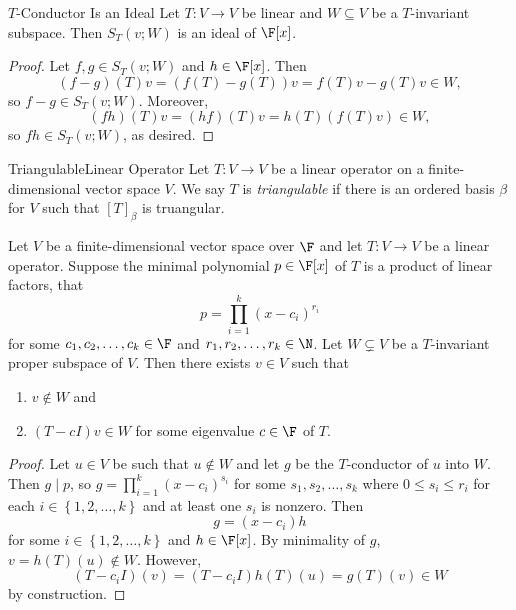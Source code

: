 \documentclass[linearalgebraII]{subfiles}
\begin{document}
    \begin{prop}{$T$-Conductor Is an Ideal}
        Let $T:V\to V$ be linear and $W\subseteq V$ be a $T$-invariant subspace. Then $S_T(v; W)$ is an ideal of $\F[x]$.
    \end{prop}

    \begin{proof}
        Let $f,g\in S_T(v; W)$ and $h\in \F[x]$. Then
        \begin{equation*}
            (f-g)(T)v = \left( f(T)-g(T) \right) v = f(T)v - g(T)v\in W,
        \end{equation*}
        so $f-g\in S_T(v; W)$. Moreover,
        \begin{equation*}
            (fh)(T)v = (hf)(T)v = h(T)\left( f(T)v \right) \in W,
        \end{equation*}
        so $fh\in S_T(v; W)$, as desired.
    \end{proof}

    \begin{definition}{Triangulable}{Linear Operator}
        Let $T:V\to V$ be a linear operator on a finite-dimensional vector space $V$. We say $T$ is \emph{triangulable} if there is an ordered basis $\beta$ for $V$ such that $[T]_\beta$ is truangular.
    \end{definition}
    
    \begin{prop}{}
        Let $V$ be a finite-dimensional vector space over $\F$ and let $T:V\to V$ be a linear operator. Suppose the minimal polynomial $p\in\F[x]$ of $T$ is a product of linear factors, that
        \begin{equation*}
            p = \prod^{k}_{i=1} (x-c_i)^{r_i}
        \end{equation*}
        for some $c_1, c_2, \ldots, c_k\in \F$ and $r_1, r_2, \ldots, r_k\in \N$. Let $W\subsetneq V$ be a $T$-invariant proper subspace of $V$. Then there exists $v\in V$ such that
        \begin{enumerate}
            \item $v\notin W$ and
            \item $(T-cI)v\in W$ for some eigenvalue $c\in\F$ of $T$.
        \end{enumerate}
    \end{prop}

    \begin{proof}
        Let $u\in V$ be such that $u\notin W$ and let $g$ be the $T$-conductor of $u$ into $W$. Then $g\mid p$, so $g = \prod^{k}_{i=1} (x-c_i)^{s_i}$ for some $s_1, s_2, \ldots, s_k$ where $0\leq s_i\leq r_i$ for each $i\in \left\lbrace 1, 2, \ldots, k \right\rbrace$ and at least one $s_i$ is nonzero. Then
        \begin{equation*}
            g = (x-c_i)h
        \end{equation*}
        for some $i\in \left\lbrace 1, 2, \ldots, k \right\rbrace$ and $h\in \F[x]$. By minimality of $g$, $v = h(T)(u)\notin W$. However,
        \begin{equation*}
            (T-c_iI)(v) = \left( T-c_iI \right)h(T)(u) = g(T)(v) \in W 
        \end{equation*}
        by construction.
    \end{proof}
\end{document}
